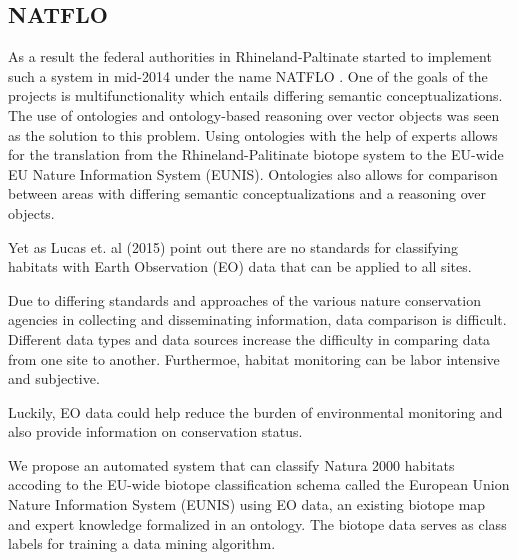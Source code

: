 \documentclass[authoryear, review,12pt,number]{elsarticle}
\begin{document}
\subsection{NATFLO}

As a result the federal authorities in Rhineland-Paltinate started to implement
such a system in mid-2014 under the name NATFLO . One of the goals of the projects is
multifunctionality which entails differing semantic conceptualizations. The use
of ontologies and ontology-based reasoning over vector objects was seen as the
solution to this problem. Using ontologies with the help of experts allows for
the translation from the Rhineland-Palitinate biotope system to the EU-wide EU
Nature Information System (EUNIS). Ontologies also allows
for comparison between areas with differing semantic conceptualizations and a
reasoning over objects. 

Yet as Lucas et. al (2015) point out there are no standards for classifying
habitats with Earth Observation (EO) data that can be applied to all sites. 

Due to differing standards and approaches of the various nature conservation
agencies in collecting and disseminating information, data comparison is
difficult. Different data types and data sources increase the difficulty in
comparing data from one site to another. Furthermoe, habitat monitoring can
be labor intensive and subjective.

Luckily, EO data could help reduce the burden of environmental monitoring and
also provide information on conservation status.

We propose an automated system that can classify Natura 2000 habitats
accoding to the EU-wide biotope classification schema called the European Union
Nature Information System (EUNIS) using EO data, an existing biotope map and
expert knowledge formalized in an ontology. The biotope data serves as class
labels for training a data mining algorithm.
\end{document}
